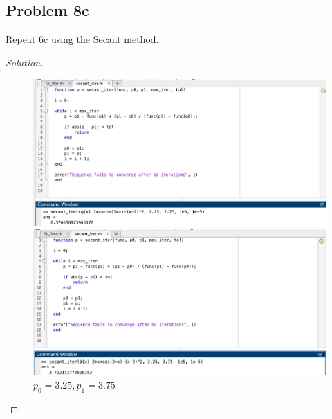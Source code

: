 \documentclass{article}
\begin{document}
\newpage
\subsection*{Problem 8c}
Repeat 6c using the Secant method.
\begin{proof}[Solution]
    \begin{figure}[htb]
        \qquad
        \begin{minipage}{.4\textwidth}
            \centering
            \includegraphics[scale=0.2]{2.3.8c1.png}
            \caption{$p_0 = 2.25, p_1 = 2.75$}
        \end{minipage}    
        \qquad
        \begin{minipage}{.4\textwidth}
            \centering
            \includegraphics[scale=0.2]{2.3.8c2.png}
            \caption{$p_0 = 3.25, p_1 = 3.75$}
        \end{minipage}        
    \end{figure} 
\end{proof}
\end{document}
